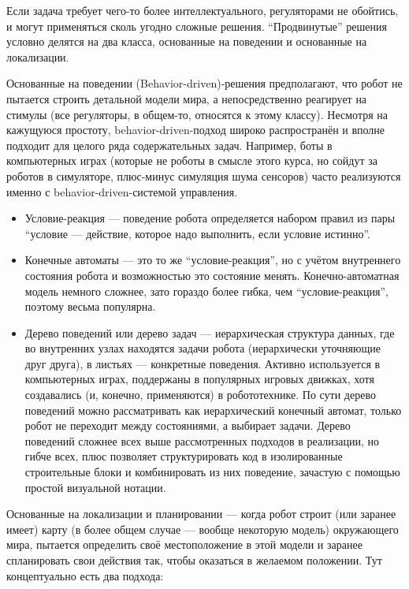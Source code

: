 \documentclass{../../text-style}
\begin{document}
Если задача требует чего-то более интеллектуального, регуляторами не обойтись, и могут применяться сколь угодно сложные решения. 
\enquote{Продвинутые} решения условно делятся на два класса, основанные на поведении и основанные на локализации.

Основанные на поведении (Behavior-driven)-решения предполагают, что робот не пытается строить детальной модели мира, а непосредственно реагирует на стимулы (все регуляторы, в общем-то, относятся к этому классу).
Несмотря на кажущуюся простоту, behavior-driven-подход широко распространён и вполне подходит для целого ряда содержательных задач.
Например, боты в компьютерных играх (которые не роботы в смысле этого курса, но сойдут за роботов в симуляторе, плюс-минус симуляция шума сенсоров) часто реализуются именно с behavior-driven-системой управления.

\begin{itemize}
    \item Условие-реакция --- поведение робота определяется набором правил из пары \enquote{условие --- действие, которое надо выполнить, если условие истинно}.
    \item Конечные автоматы --- это то же \enquote{условие-реакция}, но с учётом внутреннего состояния робота и возможностью это состояние менять.
        Конечно-автоматная модель немного сложнее, зато гораздо более гибка, чем \enquote{условие-реакция}, поэтому весьма популярна.
    \item Дерево поведений или дерево задач --- иерархическая структура данных, где во внутренних узлах находятся задачи робота (иерархически уточняющие друг друга), в листьях --- конкретные поведения.
        Активно используется в компьютерных играх, поддержаны в популярных игровых движках, хотя создавались (и, конечно, применяются) в робототехнике.
        По сути дерево поведений можно рассматривать как иерархический конечный автомат, только робот не переходит между состояниями, а выбирает задачи.
        Дерево поведений сложнее всех выше рассмотренных подходов в реализации, но гибче всех, плюс позволяет структурировать код в изолированные строительные блоки и комбинировать из них поведение, зачастую с помощью простой визуальной нотации.
\end{itemize}

Основанные на локализации и планировании --- когда робот строит (или заранее имеет) карту (в более общем случае --- вообще некоторую модель) окружающего мира, пытается определить своё местоположение в этой модели и заранее спланировать свои действия так, чтобы оказаться в желаемом положении.
Тут концептуально есть два подхода:
\end{document}
